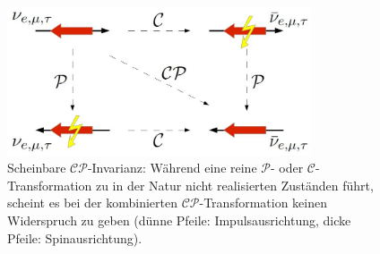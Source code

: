 \begin{figure}[hptb]
\centering
\includegraphics[width = 0.8\textwidth]{cp_invarianz}
\caption{Scheinbare $\mathcal{CP}$-Invarianz: Während eine reine $\mathcal{P}$- oder $\mathcal{C}$-Transformation zu in der Natur nicht realisierten Zuständen führt, scheint es bei der kombinierten $\mathcal{CP}$-Transformation keinen Widerspruch zu geben (dünne Pfeile: Impulsausrichtung, dicke Pfeile: Spinausrichtung).}
\label{fig:cp_invarianz}
\end{figure}



